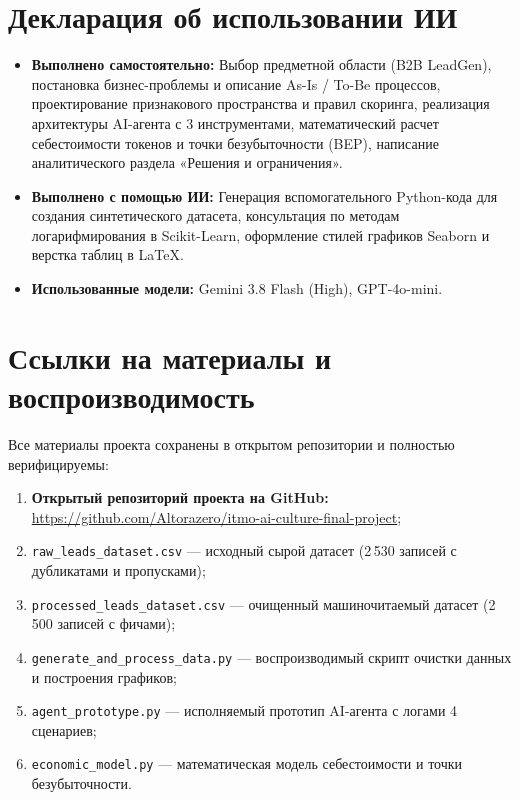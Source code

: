 \documentclass[12pt,a4paper]{article}
\begin{document}
	\section*{Декларация об использовании ИИ}
	
	\begin{itemize}[noitemsep,topsep=2pt]
		\item \textbf{Выполнено самостоятельно:} Выбор предметной области (B2B LeadGen), постановка бизнес-проблемы и описание As-Is / To-Be процессов, проектирование признакового пространства и правил скоринга, реализация архитектуры AI-агента с 3 инструментами, математический расчет себестоимости токенов и точки безубыточности (BEP), написание аналитического раздела «Решения и ограничения».
		\item \textbf{Выполнено с помощью ИИ:} Генерация вспомогательного Python-кода для создания синтетического датасета, консультация по методам логарифмирования в Scikit-Learn, оформление стилей графиков Seaborn и верстка таблиц в LaTeX.
		\item \textbf{Использованные модели:} Gemini 3.8 Flash (High), GPT-4o-mini.
	\end{itemize}

	\section*{Ссылки на материалы и воспроизводимость}
	Все материалы проекта сохранены в открытом репозитории и полностью верифицируемы:
	\begin{enumerate}[noitemsep,topsep=1pt]
		\item \textbf{Открытый репозиторий проекта на GitHub:} \url{https://github.com/Altorazero/itmo-ai-culture-final-project};
		\item \texttt{raw\_leads\_dataset.csv} --- исходный сырой датасет (2\,530 записей с дубликатами и пропусками);
		\item \texttt{processed\_leads\_dataset.csv} --- очищенный машиночитаемый датасет (2\,500 записей с фичами);
		\item \texttt{generate\_and\_process\_data.py} --- воспроизводимый скрипт очистки данных и построения графиков;
		\item \texttt{agent\_prototype.py} --- исполняемый прототип AI-агента с логами 4 сценариев;
		\item \texttt{economic\_model.py} --- математическая модель себестоимости и точки безубыточности.
	\end{enumerate}
\end{document}
